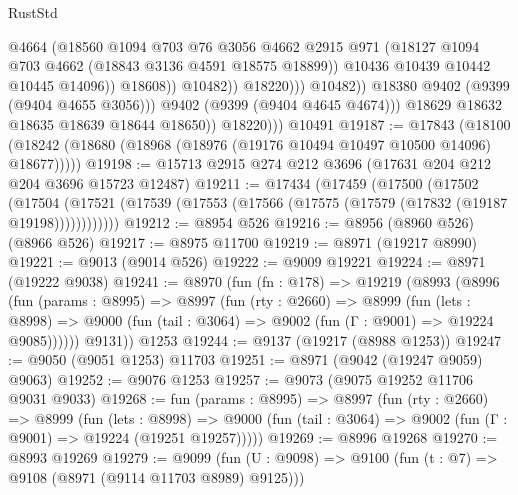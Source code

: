 \begin{lexlean}{RustStd}
\begin{coremodule}
                                      @4664
                                      (@18560
                                        @1094
                                        @703
                                        @76
                                        @3056
                                        @4662
                                        @2915
                                        @971
                                        (@18127 @1094 @703 @4662 (@18843 @3136 @4591 @18575 @18899))
                                        @10436
                                        @10439
                                        @10442
                                        @10445
                                        @14096))
                                    @18608))
                                @10482))
                            @18220)))
                      @10482))
                  @18380
                  @9402
                  (@9399 (@9404 @4655 @3056)))
                @9402
                (@9399 (@9404 @4645 @4674)))
              @18629
              @18632
              @18635
              @18639
              @18644
              @18650))
          @18220)))
    @10491
@19187 := @17843
    (@18100 (@18242 (@18680 (@18968 (@18976 (@19176 @10494 @10497 @10500 @14096) @18677)))))
@19198 := @15713 @2915 @274 @212 @3696 (@17631 @204 @212 @204 @3696 @15723 @12487)
@19211 := @17434
    (@17459
      (@17500
        (@17502
          (@17504 (@17521 (@17539 (@17553 (@17566 (@17575 (@17579 (@17832 (@19187 @19198))))))))))))
@19212 := @8954 @526
@19216 := @8956 (@8960 @526) (@8966 @526)
@19217 := @8975 @11700
@19219 := @8971 (@19217 @8990)
@19221 := @9013 (@9014 @526)
@19222 := @9009 @19221
@19224 := @8971 (@19222 @9038)
@19241 := @8970
    (fun (fn : @178) =>
    @19219
      (@8993
        (@8996
          (fun (params : @8995) =>
          @8997
            (fun (rty : @2660) =>
            @8999
              (fun (lets : @8998) =>
              @9000 (fun (tail : @3064) => @9002 (fun (Γ : @9001) => @19224 @9085))))))
        @9131))
    @1253
@19244 := @9137 (@19217 (@8988 @1253))
@19247 := @9050 (@9051 @1253) @11703
@19251 := @8971 (@9042 (@19247 @9059) @9063)
@19252 := @9076 @1253
@19257 := @9073 (@9075 @19252 @11706 @9031 @9033)
@19268 := fun (params : @8995) =>
  @8997
    (fun (rty : @2660) =>
    @8999
      (fun (lets : @8998) =>
      @9000 (fun (tail : @3064) => @9002 (fun (Γ : @9001) => @19224 (@19251 @19257)))))
@19269 := @8996 @19268
@19270 := @8993 @19269
@19279 := @9099
    (fun (U : @9098) => @9100 (fun (t : @7) => @9108 (@8971 (@9114 @11703 @8989) @9125)))

\end{coremodule}
\end{lexlean}

